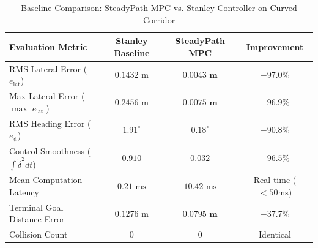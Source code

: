 \begin{table}[h]
\centering
\caption{Baseline Comparison: SteadyPath MPC vs. Stanley Controller on Curved Corridor}
\label{tab:stanley_vs_mpc}
\renewcommand{\arraystretch}{1.2}
\begin{tabular}{lccc}
\hline\hline
\textbf{Evaluation Metric} & \textbf{Stanley Baseline} & \textbf{SteadyPath MPC} & \textbf{Improvement} \\
\hline
RMS Lateral Error ($e_{\text{lat}}$)     & $0.1432\text{ m}$   & $\mathbf{0.0043\text{ m}}$   & $\mathbf{-97.0\%}$ \\
Max Lateral Error ($\max |e_{\text{lat}}|$) & $0.2456\text{ m}$   & $\mathbf{0.0075\text{ m}}$   & $\mathbf{-96.9\%}$ \\
RMS Heading Error ($e_{\psi}$)         & $1.91^\circ$        & $\mathbf{0.18^\circ}$        & $\mathbf{-90.8\%}$ \\
Control Smoothness ($\int \dot{\delta}^2 dt$) & $0.910$             & $\mathbf{0.032}$             & $\mathbf{-96.5\%}$ \\
Mean Computation Latency               & $0.21\text{ ms}$    & $10.42\text{ ms}$            & Real-time ($< 50\text{ms}$) \\
Terminal Goal Distance Error           & $0.1276\text{ m}$   & $\mathbf{0.0795\text{ m}}$   & $\mathbf{-37.7\%}$ \\
Collision Count                        & $0$                 & $0$                          & Identical \\
\hline\hline
\end{tabular}
\end{table}
